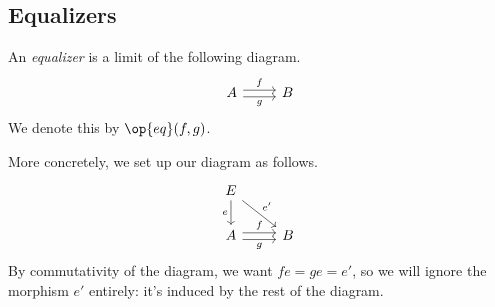 \documentclass[../notes.tex]{subfiles}
\begin{document}
\subsection{Equalizers}
\begin{defi}[Equalizer]
	An \textit{equalizer} is a limit of the following diagram.
	\[\begin{tikzcd}
		A & B
		\arrow["g"', shift right=1, from=1-1, to=1-2]
		\arrow["f", shift left=1, from=1-1, to=1-2]
	\end{tikzcd}\]
	We denote this by $\op{eq}(f,g)$.
\end{defi}
More concretely, we set up our diagram as follows.
\[\begin{tikzcd}
	E \\
	A & B
	\arrow["g"', shift right=1, from=2-1, to=2-2]
	\arrow["f", shift left=1, from=2-1, to=2-2]
	\arrow["e"', from=1-1, to=2-1]
	\arrow["{e'}", from=1-1, to=2-2]
\end{tikzcd}\]
By commutativity of the diagram, we want $fe=ge=e'$, so we will ignore the morphism $e'$ entirely: it's induced by the rest of the diagram.
\end{document}
